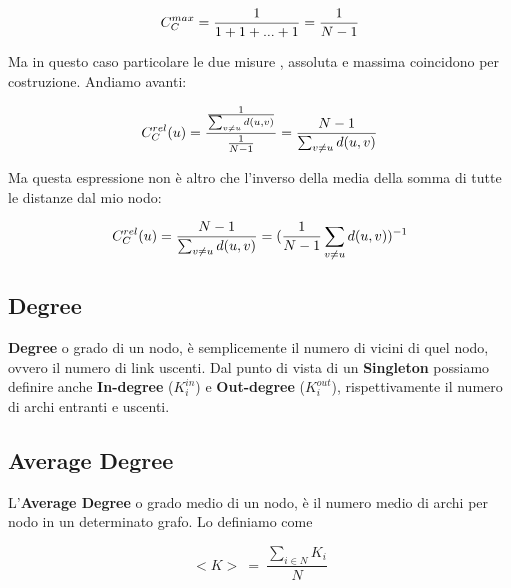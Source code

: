\documentclass[12pt,twoside]{report}
\begin{document}
    \begin{equation}
    \large
        \displaystyle C_C^{max} = \frac{1}{1+1+...+1} = \frac{1}{N - 1}
    \end{equation}\vspace{0.5em}
    
    Ma in questo caso particolare le due misure , assoluta e massima coincidono per costruzione. Andiamo avanti:
    
    \begin{equation}
    \large
        \displaystyle C_C^{rel}(u) = \frac{\frac{1} {\sum_{v \neq u } d(u,v)}}{\frac{1}{N - 1}} = \frac{N - 1} {\sum_{v \neq u } d(u,v)}
    \end{equation}\vspace{0.5em}
    
    Ma questa espressione non è altro che l'inverso della media della somma di tutte le distanze dal mio nodo: 
    
    
    \begin{equation}
    \large
        \displaystyle C_C^{rel}(u) =  \frac{N - 1} {\sum_{v \neq u } d(u,v)} = (\frac{1}{N-1} \sum_{v \neq u } d(u,v))^{-1}
    \end{equation}\vspace{0.5em}
    
   
    
    
\subsection{Degree}
    
    \textbf{Degree} o grado di un nodo, è semplicemente il numero di vicini di quel nodo, ovvero il numero di link uscenti. Dal punto di vista di un \textbf{Singleton} possiamo definire anche \textbf{In-degree} ($K^{in}_i$) e \textbf{Out-degree} ($K^{out}_i$), rispettivamente il numero di archi entranti e uscenti.
    
\subsection{Average Degree}
    
    L'\textbf{Average Degree} o grado medio di un nodo, è il numero medio di archi per nodo in un determinato grafo. Lo definiamo come

    \begin{equation}
        <K> \ = \ \frac{\sum_{i \in N} K_i}{N}
    \end{equation}
    
\end{document}
